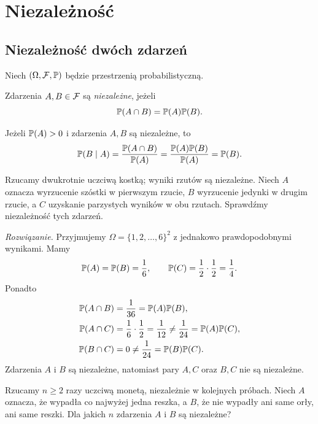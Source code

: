 \chapter{Niezależność}
\label{chap:niezaleznosc}


\section{Niezależność dwóch zdarzeń}
\label{sec:niezaleznosc-dwoch}

Niech $(\Omega,\mathcal{F},\mathbb{P})$ będzie przestrzenią probabilistyczną.

\begin{definicja}
\label{def:niezaleznosc-dwoch}
Zdarzenia $A,B\in\mathcal{F}$ są \emph{niezależne}, jeżeli
\begin{equation}
  \mathbb{P}(A\cap B)=\mathbb{P}(A)\mathbb{P}(B).
  \label{eq:niezaleznosc-dwoch}
\end{equation}
\end{definicja}

\begin{uwaga}
Jeżeli $\mathbb{P}(A)>0$ i zdarzenia $A,B$ są niezależne, to
\[
  \mathbb{P}(B\mid A)=\frac{\mathbb{P}(A\cap B)}{\mathbb{P}(A)}
    =\frac{\mathbb{P}(A)\mathbb{P}(B)}{\mathbb{P}(A)}=\mathbb{P}(B).
\]
\end{uwaga}

\begin{przyklad}
\label{przykl:kostka-niezaleznosc}
Rzucamy dwukrotnie uczciwą kostką; wyniki rzutów są niezależne.
Niech $A$ oznacza wyrzucenie szóstki w pierwszym rzucie,
$B$ wyrzucenie jedynki w drugim rzucie, a $C$ uzyskanie
parzystych wyników w obu rzutach. Sprawdźmy niezależność tych zdarzeń.
\end{przyklad}

\noindent\emph{Rozwiązanie.}
Przyjmujemy $\Omega=\{1,2,\ldots,6\}^2$ z jednakowo prawdopodobnymi
wynikami. Mamy
\[
  \mathbb{P}(A)=\mathbb{P}(B)=\frac16,
  \qquad \mathbb{P}(C)=\frac12\cdot\frac12=\frac14.
\]
Ponadto
\begin{align*}
  \mathbb{P}(A\cap B)&=\frac1{36}=\mathbb{P}(A)\mathbb{P}(B),\\
  \mathbb{P}(A\cap C)&=\frac16\cdot\frac12=\frac1{12}
    \ne\frac1{24}=\mathbb{P}(A)\mathbb{P}(C),\\
  \mathbb{P}(B\cap C)&=0\ne\frac1{24}=\mathbb{P}(B)\mathbb{P}(C).
\end{align*}
Zdarzenia $A$ i $B$ są niezależne, natomiast pary $A,C$ oraz $B,C$
nie są niezależne.

\begin{przyklad}
\label{przykl:moneta-niezaleznosc}
Rzucamy $n\geq2$ razy uczciwą monetą, niezależnie w kolejnych próbach.
Niech $A$ oznacza, że wypadła co najwyżej jedna reszka,
a $B$, że nie wypadły ani same orły, ani same reszki.
Dla jakich $n$ zdarzenia $A$ i $B$ są niezależne?
\end{przyklad}

